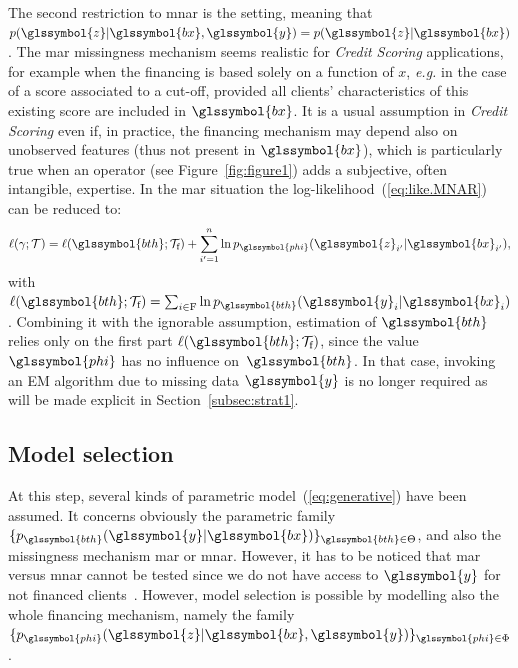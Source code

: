 The second restriction to \gls{mnar} is the  setting, meaning that $p(\glssymbol{z}| \glssymbol{bx},\glssymbol{y}) = p(\glssymbol{z}|\glssymbol{bx})$. The \gls{mar} missingness mechanism seems realistic for \textit{Credit Scoring} applications, for example when the financing is based solely on a function of $x$, {\it e.g.} in the case of a score associated to a cut-off, provided all clients' characteristics of this existing \gls{score} are included in $\glssymbol{bx}$. It is a usual assumption in \textit{Credit Scoring} even if, in practice, the financing mechanism may depend also on unobserved features (thus not present in $\glssymbol{bx}$), which is particularly true when an operator (see Figure~\ref{fig:figure1}) adds a subjective, often intangible, expertise. In the \gls{mar} situation the log-likelihood~(\ref{eq:like.MNAR}) can be reduced to:
\begin{equation}\label{eq:like.MAR}
\ell(\gamma;\mathcal{T}) = \ell(\glssymbol{bth};\mathcal{T}_{\text{f}}) + \sum_{i'=1}^n \ln p_{\glssymbol{phi}}(\glssymbol{z}_{i'} | \glssymbol{bx}_{i'}),
\end{equation}
with $\ell(\glssymbol{bth};\mathcal{T}_{\text{f}})=\sum_{i\in\text{F}}\ln p_{\glssymbol{bth}}(\glssymbol{y}_i | \glssymbol{bx}_i)$.
Combining it with the ignorable assumption, estimation of $\glssymbol{bth}$ relies only on the first part $\ell(\glssymbol{bth};\mathcal{T}_{\text{f}})$, since the value $\glssymbol{phi}$ has no influence on~$\glssymbol{bth}$. In that case, invoking an EM algorithm due to missing data $\glssymbol{y}$ is no longer required as will be made explicit in Section~\ref{subsec:strat1}.

\subsection{Model selection} \label{subsec:model_selection}

At this step, several kinds of parametric model~(\ref{eq:generative}) have been assumed. It concerns obviously the parametric family $\{p_{\glssymbol{bth}}(\glssymbol{y}|\glssymbol{bx})\}_{\glssymbol{bth} \in\Theta}$, and also the missingness mechanism \gls{mar} or \gls{mnar}. 
However, it has to be noticed that \gls{mar} versus \gls{mnar} cannot be tested since we do not have access to $\glssymbol{y}$ for not financed clients~\cite{molenberghs2008every}. However, model selection is possible by modelling also the whole financing mechanism, namely the family $\{p_{\glssymbol{phi}}(\glssymbol{z}|\glssymbol{bx},\glssymbol{y})\}_{\glssymbol{phi} \in \Phi}$.


